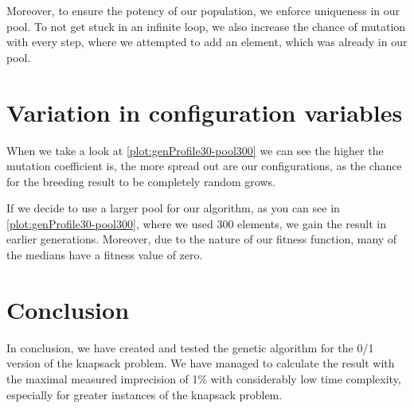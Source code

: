 Moreover, to ensure the potency of our population, we enforce uniqueness in our pool. To not
get stuck in an infinite loop, we also increase the chance of mutation with every step,
where we attempted to add an element, which was already in our pool.

















\section{Variation in configuration variables}
When we take a look at \cref{plot:genProfile30-pool300} we can see the higher
the mutation coefficient is, the more spread out are our configurations, as
the chance for the breeding result to be completely random grows.

If we decide to use a larger pool for our algorithm, as you can see in \cref{plot:genProfile30-pool300},
where we used 300 elements, we gain the result in earlier generations. Moreover,
due to the nature of our fitness function, many of the medians have a fitness value of zero.

\section{Conclusion}
In conclusion, we have created and tested the genetic algorithm for the 0/1 version
of the knapsack problem. We have managed to calculate the result with the maximal
measured imprecision of 1\% with considerably low time complexity, especially for
greater instances of the knapsack problem.

\newpage



